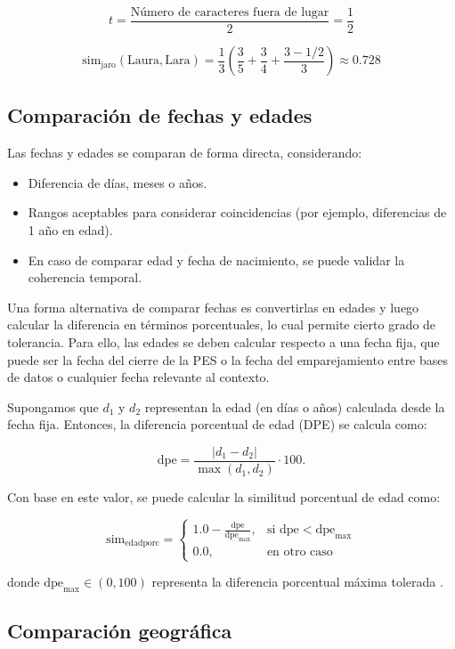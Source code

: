 \documentclass[
  12pt,
]{book}
\providecommand{\tightlist}{%
  \setlength{\itemsep}{0pt}\setlength{\parskip}{0pt}}
\begin{document}
\[t = \frac{\text{Número de caracteres fuera de lugar}}{2} = \frac{1}{2}\]

\[\text{sim}_{\text{jaro}}(\text{Laura}, \text{Lara}) = \frac{1}{3}\left( \frac{3}{5} + \frac{3}{4} + \frac{3 - 1/2}{3}\right) \approx 0.728\]

\subsection{Comparación de fechas y edades}\label{comparaciuxf3n-de-fechas-y-edades}

Las fechas y edades se comparan de forma directa, considerando:

\begin{itemize}
\tightlist
\item
  Diferencia de días, meses o años.
\item
  Rangos aceptables para considerar coincidencias (por ejemplo, diferencias de 1 año en edad).
\item
  En caso de comparar edad y fecha de nacimiento, se puede validar la coherencia temporal.
\end{itemize}

Una forma alternativa de comparar fechas es convertirlas en edades y luego calcular la diferencia en términos porcentuales, lo cual permite cierto grado de tolerancia. Para ello, las edades se deben calcular respecto a una fecha fija, que puede ser la fecha del cierre de la PES o la fecha del emparejamiento entre bases de datos o cualquier fecha relevante al contexto.

Supongamos que \(d_1\) y \(d_2\) representan la edad (en días o años) calculada desde la fecha fija. Entonces, la diferencia porcentual de edad (DPE) se calcula como:

\[\text{dpe} = \frac{|d_1 - d_2|}{\max(d_1, d_2)} \cdot 100.\]

Con base en este valor, se puede calcular la similitud porcentual de edad como:

\[
\text{sim}_{\text{edadporc}} =
\begin{cases}
1.0 - \frac{\text{dpe}}{\text{dpe}_{\max}}, & \text{si } \text{dpe} < \text{dpe}_{\max} \\
0.0, & \text{en otro caso}
\end{cases}
\]

donde \(\text{dpe}_{\max} \in (0, 100)\) representa la diferencia porcentual máxima tolerada \citep{christen2012data}.

\subsection{Comparación geográfica}\label{comparaciuxf3n-geogruxe1fica}
\end{document}
